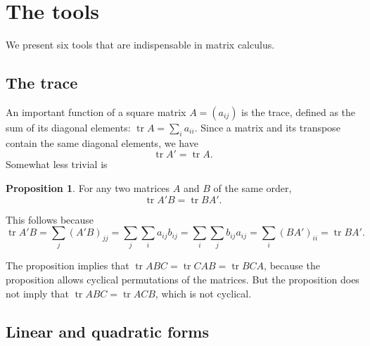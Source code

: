 \documentclass[12pt,a4paper]{article}
\makeatletter
\theoremstyle{definition}
\newtheorem{proposition}{Proposition}
\renewenvironment{proof}[1][\proofname]{\par
  \pushQED{\qed}%
  \normalfont \topsep6\p@\@plus6\p@\relax
  \trivlist
  \item[\hskip\labelsep\bfseries #1\@addpunct{.}]\ignorespaces
}{%
  \popQED\endtrivlist\@endpefalse
}
\DeclareMathOperator{\tr}{tr}
\makeatother
\begin{document}
\section{The tools}\label{sec:2}

We present six tools that are indispensable in matrix calculus. %

\subsection{The trace}\label{sec:2.1}

An important function of a square matrix $A = (a_{ij})$ is the trace, defined as the sum of its diagonal elements: $\tr A = \sum_i a_{ii}$. %
Since a matrix and its transpose contain the same diagonal elements, we have
\begin{equation}\label{eq:1}
\tr A' = \tr A.
\end{equation}
Somewhat less trivial is

\begin{proposition}\label{prp:1}
For any two matrices $A$ and $B$ of the same order,
\[
\tr A'B = \tr BA'.
\]
\end{proposition}

\begin{proof}
This follows because
\[
\tr A'B = \sum_j (A'B)_{jj} = \sum_j \sum_i a_{ij} b_{ij}
= \sum_i \sum_j b_{ij} a_{ij} = \sum_i (BA')_{ii} = \tr BA'.
\]
\end{proof}

The proposition implies that $\tr ABC = \tr CAB = \tr BCA$, because the proposition allows cyclical permutations of the matrices. But the proposition does not imply that $\tr ABC = \tr ACB$, which is not cyclical. %

\subsection{Linear and quadratic forms}\label{sec:2.2}
\end{document}
